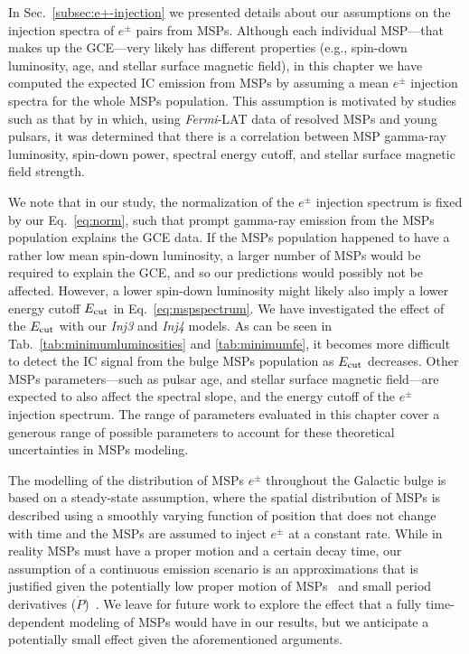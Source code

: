 \documentclass[doublespace,nopageskip]{VTthesis} %
\begin{document}
In Sec.~\ref{subsec:e+-injection} we presented details about our assumptions on the injection spectra of $e^\pm$ pairs from MSPs. Although each individual MSP---that makes up the GCE---very likely has different properties (e.g., spin-down luminosity, age, and stellar surface magnetic field), in this chapter we have computed the expected IC emission from MSPs by assuming a mean $e^\pm$ injection spectra for the whole MSPs population. This assumption is motivated by studies such as that by \citet{2019ApJ...883L...4K} in which, using \textit{Fermi}-LAT data of resolved MSPs and young pulsars, it was determined that there is a correlation between MSP gamma-ray luminosity, spin-down power, spectral energy cutoff, and stellar surface magnetic field strength.  

We note that in our study, the normalization of the $e^\pm$ injection spectrum is fixed by our Eq.~\ref{eq:norm}, such that prompt gamma-ray emission from the MSPs population explains the GCE data. If the MSPs population happened to have a rather low mean spin-down luminosity, a larger number of MSPs would be required to explain the GCE, and so our predictions would possibly not be affected. However, a lower spin-down luminosity might likely also imply a lower energy cutoff $E_{\rm cut}$ in Eq.~\ref{eq:mspspectrum}. We have investigated the effect of the $E_{\rm cut}$ with our \textit{Inj3} and \textit{Inj4} models. As can be seen in Tab.~\ref{tab:minimumluminosities} and \ref{tab:minimumfe}, it becomes more difficult to detect the IC signal from the bulge MSPs population as $E_{\rm cut}$ decreases. Other MSPs parameters---such as pulsar age, and stellar surface magnetic field---are expected to also affect the spectral slope, and the energy cutoff of the $e^\pm$ injection spectrum. The range of parameters evaluated in this chapter cover a generous range of possible parameters to account for these theoretical uncertainties in MSPs modeling.

The modelling of the distribution of MSPs $e^\pm$ throughout the Galactic bulge is based on a steady-state assumption, where the spatial distribution of MSPs is described using a smoothly varying function of position that does not change with time and the MSPs are assumed to inject $e^\pm$ at a constant rate. While in reality MSPs must have a proper motion and a certain decay time, our assumption of a continuous emission scenario is an approximations that is justified given the potentially low proper motion of MSPs~\citep{2005MNRAS.360..974H} and small period derivatives ($\dot{P}$)~\citep{2021arXiv210105751H}. We leave for future work to explore the effect that a fully time-dependent modeling of MSPs would have in our results, but we anticipate a potentially small effect given the aforementioned arguments.
\end{document}
